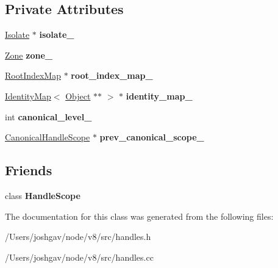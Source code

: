 \subsection*{Private Attributes}
\begin{DoxyCompactItemize}
\item 
\hyperlink{classv8_1_1internal_1_1_isolate}{Isolate} $\ast$ {\bfseries isolate\+\_\+}\hypertarget{classv8_1_1internal_1_1_canonical_handle_scope_aecd98eae2c03192dc6dc96f41241b2c0}{}\label{classv8_1_1internal_1_1_canonical_handle_scope_aecd98eae2c03192dc6dc96f41241b2c0}

\item 
\hyperlink{classv8_1_1internal_1_1_zone}{Zone} {\bfseries zone\+\_\+}\hypertarget{classv8_1_1internal_1_1_canonical_handle_scope_ad4797a80a295e2f294fff179f13a96ce}{}\label{classv8_1_1internal_1_1_canonical_handle_scope_ad4797a80a295e2f294fff179f13a96ce}

\item 
\hyperlink{classv8_1_1internal_1_1_root_index_map}{Root\+Index\+Map} $\ast$ {\bfseries root\+\_\+index\+\_\+map\+\_\+}\hypertarget{classv8_1_1internal_1_1_canonical_handle_scope_ae34fc02c10bc1a463897dfcd581ce840}{}\label{classv8_1_1internal_1_1_canonical_handle_scope_ae34fc02c10bc1a463897dfcd581ce840}

\item 
\hyperlink{classv8_1_1internal_1_1_identity_map}{Identity\+Map}$<$ \hyperlink{classv8_1_1internal_1_1_object}{Object} $\ast$$\ast$ $>$ $\ast$ {\bfseries identity\+\_\+map\+\_\+}\hypertarget{classv8_1_1internal_1_1_canonical_handle_scope_a5a334801ca1d5dd5253198a78f74a33b}{}\label{classv8_1_1internal_1_1_canonical_handle_scope_a5a334801ca1d5dd5253198a78f74a33b}

\item 
int {\bfseries canonical\+\_\+level\+\_\+}\hypertarget{classv8_1_1internal_1_1_canonical_handle_scope_a31b212f95cc7568a2160072e34000976}{}\label{classv8_1_1internal_1_1_canonical_handle_scope_a31b212f95cc7568a2160072e34000976}

\item 
\hyperlink{classv8_1_1internal_1_1_canonical_handle_scope}{Canonical\+Handle\+Scope} $\ast$ {\bfseries prev\+\_\+canonical\+\_\+scope\+\_\+}\hypertarget{classv8_1_1internal_1_1_canonical_handle_scope_a549b3ba418dd8558cd57f7c8192f8ac5}{}\label{classv8_1_1internal_1_1_canonical_handle_scope_a549b3ba418dd8558cd57f7c8192f8ac5}

\end{DoxyCompactItemize}
\subsection*{Friends}
\begin{DoxyCompactItemize}
\item 
class {\bfseries Handle\+Scope}\hypertarget{classv8_1_1internal_1_1_canonical_handle_scope_a5f127e488db492b05c8542cec0b880b7}{}\label{classv8_1_1internal_1_1_canonical_handle_scope_a5f127e488db492b05c8542cec0b880b7}

\end{DoxyCompactItemize}


The documentation for this class was generated from the following files\+:\begin{DoxyCompactItemize}
\item 
/\+Users/joshgav/node/v8/src/handles.\+h\item 
/\+Users/joshgav/node/v8/src/handles.\+cc\end{DoxyCompactItemize}
